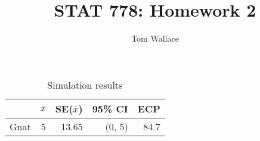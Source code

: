 \documentclass{article}
\author{Tom Wallace}
\title{STAT 778: Homework 2}
\begin{document}
\maketitle

\begin{table}
	\centering
	\caption{Simulation results}
	\begin{tabular}{|lrrrr|}
		\hline
		& $\bar{x}$ & SE($\bar{x}$) & 95\% CI & ECP\\
		\hline
		Gnat & 5 & 13.65 & (0, 5) & 84.7\\
		\hline
	\end{tabular}
\end{table}

	
\end{document}
